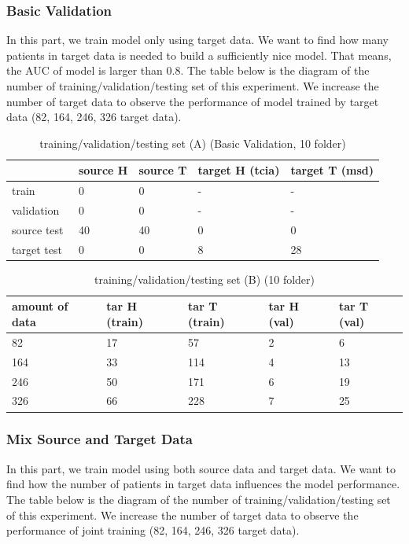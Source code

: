 \subsubsection{Basic Validation}
In this part, we train model only using target data. We want to find how many patients in target data is needed to build a sufficiently nice model. That means, the AUC of model is larger than 0.8. The table below is the diagram of the number of training/validation/testing set of this experiment. We increase the number of target data to observe the performance of model trained by target data (82, 164, 246, 326 target data).
\begin{table}[H]
\centering
\caption{training/validation/testing set (A) (Basic Validation, 10 folder)}
\begin{tabular}{|l|l|l|l|l|} 
\hline
~            & source H & source T & target H (tcia) & target T (msd)  \\ 
\hline
train        & 0      & 0      & -               & -               \\ 
\hline
validation   & 0       & 0       & -               & -               \\ 
\hline
source test  & 40       & 40       & 0               & 0               \\ 
\hline
target test~ & 0        & 0        & 8               & 28              \\
\hline
\end{tabular}
\end{table}

\begin{table}[H]
\centering
\caption{training/validation/testing set (B) (10 folder)}
\begin{tabular}{|l|l|l|l|l|} 
\hline
amount of data   & tar H (train) & tar T (train) & tar H (val) & tar T (val)  \\ 
\hline
82        & 17      & 57      & 2               & 6               \\ 
\hline
164   & 33       & 114       & 4               & 13               \\ 
\hline
246  & 50       & 171       & 6               & 19               \\ 
\hline
326 & 66        & 228        & 7               & 25              \\
\hline
\end{tabular}
\end{table}

\subsubsection{Mix Source and Target Data}
In this part, we train model using both source data and target data. We want to find how the number of  patients in target data influences the model performance. The table below is the diagram of the number of training/validation/testing set of this experiment. We increase the number of target data to observe the performance of joint training (82, 164, 246, 326 target data).

